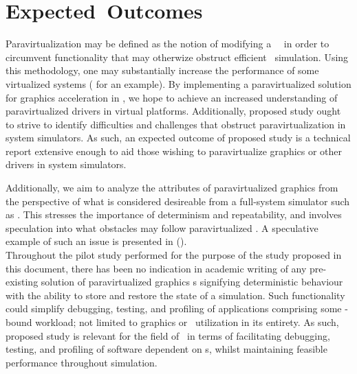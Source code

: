 \chapter{Expected~Outcomes}
\label{cha:expectedoutcomes}
Paravirtualization may be defined as the notion of modifying a \termtarget\ \termos\ in order to circumvent functionality that may otherwize obstruct efficient \termisa\ simulation.
Using this methodology, one may substantially increase the performance of some virtualized systems ( for an example).
By implementing a paravirtualized solution for graphics acceleration in \termsimics , we hope to achieve an increased understanding of paravirtualized drivers in virtual platforms. Additionally, proposed study ought to strive to identify difficulties and challenges that obstruct paravirtualization in system simulators. As such, an expected outcome of proposed study is a technical report extensive enough to aid those wishing to paravirtualize graphics or other drivers in system simulators.

Additionally, we aim to analyze the attributes of paravirtualized graphics from the perspective of what is considered desireable from a full-system simulator such as \termsimics .
This stresses the importance of determinism and repeatability, and involves speculation into what obstacles may follow paravirtualized \termopengles .
A speculative example of such an issue is presented in  ().\\

\noindent
Throughout the pilot study performed for the purpose of the study proposed in this document, there has been no indication in academic writing of any pre-existing solution of paravirtualized graphics \termapi s signifying deterministic behaviour with the ability to store and restore the state of a simulation.
Such functionality could simplify debugging, testing, and profiling of applications comprising some \termgpu -bound workload; not limited to graphics or \termgpu\ utilization in its entirety.
As such, proposed study is relevant for the field of \termcompsci\ in terms of facilitating debugging, testing, and profiling of software dependent on \termgpu s, whilst maintaining feasible performance throughout simulation.

